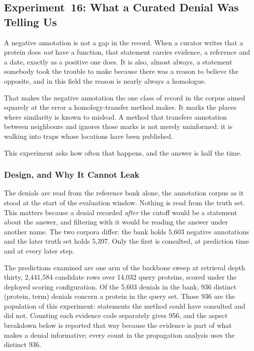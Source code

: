 \subsection{Experiment~16: What a Curated Denial Was Telling Us}
\label{sec:exp16-curated-denials}

A negative annotation is not a gap in the record. When a curator writes that a protein
does \emph{not} have a function, that statement carries evidence, a reference and a
date, exactly as a positive one does. It is also, almost always, a statement somebody
took the trouble to make because there was a reason to believe the opposite, and in
this field the reason is nearly always a homologue.

That makes the negative annotation the one class of record in the corpus aimed squarely
at the error a homology-transfer method makes. It marks the places where similarity is
known to mislead. A method that transfers annotation between neighbours and ignores
those marks is not merely uninformed: it is walking into traps whose locations have
been published.

This experiment asks how often that happens, and the answer is half the time.

\subsubsection{Design, and Why It Cannot Leak}

The denials are read from the reference bank alone, the annotation corpus as it stood
at the start of the evaluation window. Nothing is read from the truth set. This matters
because a denial recorded \emph{after} the cutoff would be a statement about the answer,
and filtering with it would be reading the answer under another name. The two corpora
differ: the bank holds 5{,}603 negative annotations and the later truth set holds
5{,}397. Only the first is consulted, at prediction time and at every later step.

The predictions examined are one arm of the backbone sweep at retrieval depth thirty,
2{,}441{,}584 candidate rows over 14{,}032 query proteins, scored under the deployed
scoring configuration. Of the 5{,}603 denials in the bank, 936 distinct (protein, term) denials concern a
protein in the query set. Those 936 are the population of this experiment: statements
the method could have consulted and did not. Counting each evidence code separately
gives 956, and the aspect breakdown below is reported that way because the evidence is
part of what makes a denial informative; every count in the propagation analysis uses
the distinct 936.

